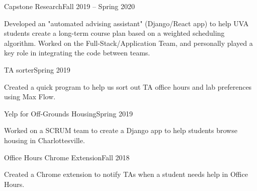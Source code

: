 \documentclass[letterpaper,10pt]{article}
\begin{document}
\begin{project}{Capstone Research}{Fall 2019 -- Spring 2020}
    \item Developed an "automated advising assistant" (Django/React app) to help UVA students create a long-term course plan based on a weighted scheduling algorithm. Worked on the Full-Stack/Application Team, and personally played a key role in integrating the code between teams.
\end{project}

\begin{project}{TA sorter}{Spring 2019}
    \item Created a quick program to help us sort out TA office hours and lab preferences using Max Flow.
\end{project}

\begin{project}{Yelp for Off-Grounds Housing}{Spring 2019}
    \item Worked on a SCRUM team to create a Django app to help students browse housing in Charlottesville.
\end{project}

\begin{project}{Office Hours Chrome Extension}{Fall 2018}
    \item Created a Chrome extension to notify TAs when a student needs help in Office Hours.
\end{project}
\end{document}
